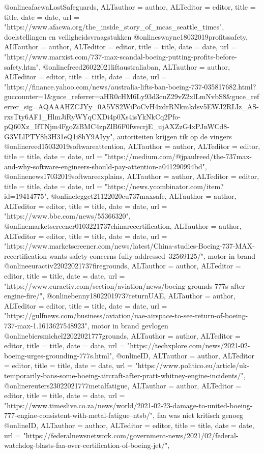 {{{{{{{{{@online{afacwaLostSafeguards,	ALTauthor = {author},	ALTeditor = {editor},	title = {title},	date = {date},	url = {"https://www.afacwa.org/the_inside_story_of_mcas_seattle_times"},}
doelstellingen en veiligheidsvraagstukken
@online{swayne18032019profitssafety,	ALTauthor = {author},	ALTeditor = {editor},	title = {title},	date = {date},	url = {"https://www.marxist.com/737-max-scandal-boeing-putting-profits-before-safety.htm"},}
@online{freed26022021liftaustraliaban,	ALTauthor = {author},	ALTeditor = {editor},	title = {title},	date = {date},	url = {"https://finance.yahoo.com/news/australia-lifts-ban-boeing-737-035817682.html?guccounter=1&guce_referrer=aHR0cHM6Ly93d3cuZ29vZ2xlLmNvbS8&guce_referrer_sig=AQAAAHZCJYy_0A5VS2WiPoCvH4xdrRNkmkdsv5EWJ2RLIz_AS-rxsTty6AF1_HlmJiRyWYqCXDi4p0Xs4isYkNkCq2Pfo-pQ60Xz_IfTNjm4FgoZiBMC4zpZlB6F0fwecrjE_ujAXZzG4xPJnWCd8-G3VLlPTY8h3H31eQ1i8hY9AIyy"},}
autoriteiten krijgen tik op de vingers
@online{reed15032019softwareattention,	ALTauthor = {author},	ALTeditor = {editor},	title = {title},	date = {date},	url = {"https://medium.com/@jpaulreed/the-737max-and-why-software-engineers-should-pay-attention-a041290994bd"},}
@online{news17032019softwareexplains,	ALTauthor = {author},	ALTeditor = {editor},	title = {title},	date = {date},	url = {"https://news.ycombinator.com/item?id=19414775"},}
@online{legget21122020eu737maxsafe,	ALTauthor = {author},	ALTeditor = {editor},	title = {title},	date = {date},	url = {"https://www.bbc.com/news/55366320"},}
@online{marketscreener0103221737chinarecertification,	ALTauthor = {author},	ALTeditor = {editor},	title = {title},	date = {date},	url = {"https://www.marketscreener.com/news/latest/China-studies-Boeing-737-MAX-recertification-wants-safety-concerns-fully-addressed--32569125/"},}
motor in brand
@online{euractiv22022021737firegrounds,	ALTauthor = {author},	ALTeditor = {editor},	title = {title},	date = {date},	url = {"https://www.euractiv.com/section/aviation/news/boeing-grounds-777s-after-engine-fire/"},}
@online{benny18022019737returnUAE,	ALTauthor = {author},	ALTeditor = {editor},	title = {title},	date = {date},	url = {"https://gulfnews.com/business/aviation/uae-airspace-to-see-return-of-boeing-737-max-1.1613627548923"},}
motor in brand gevlogen
@online{biersmichel22022021777grounds,	ALTauthor = {author},	ALTeditor = {editor},	title = {title},	date = {date},	url = {"https://techxplore.com/news/2021-02-boeing-urges-grounding-777s.html"},}
@online{ID,	ALTauthor = {author},	ALTeditor = {editor},	title = {title},	date = {date},	url = {"https://www.politico.eu/article/uk-temporarily-bans-some-boeing-aircraft-after-pratt-whitney-engine-incidents/"},}
@online{reuters23022021777metalfatigue,	ALTauthor = {author},	ALTeditor = {editor},	title = {title},	date = {date},	url = {"https://www.timeslive.co.za/news/world/2021-02-23-damage-to-united-boeing-777-engine-consistent-with-metal-fatigue--ntsb/"},}
faa was niet kritisch genoeg
@online{ID,	ALTauthor = {author},	ALTeditor = {editor},	title = {title},	date = {date},	url = {"https://federalnewsnetwork.com/government-news/2021/02/federal-watchdog-blasts-faa-over-certification-of-boeing-jet/"},}


}}}}}}}}}
